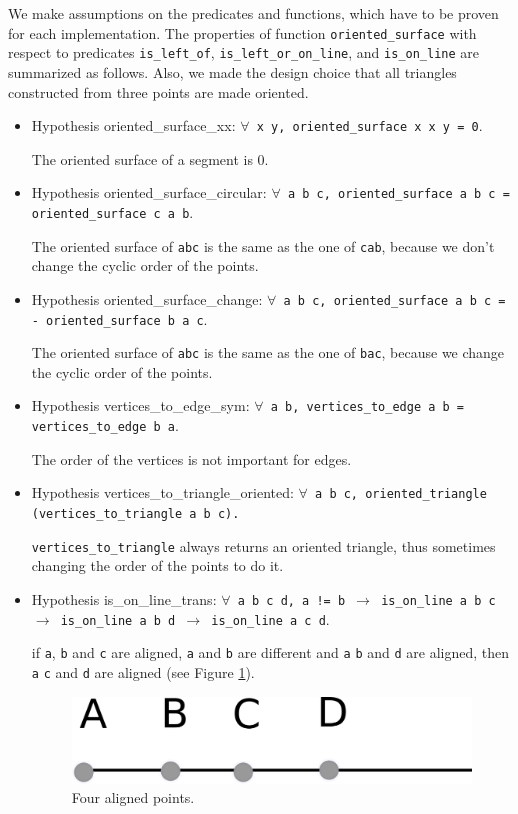 \documentclass[a4paper,10pt]{article}
\def\hypothesis#1#2{{\color{purple}Hypothesis} {\color{blue}#1}: {\tt #2}}
\begin{document}
We make assumptions on the predicates and functions, which have to be proven for each implementation. The properties of function {\tt oriented\_surface} with respect to predicates {\tt is\_left\_of}, {\tt is\_left\_or\_on\_line}, and {\tt is\_on\_line} are summarized as follows.  Also, we made the design choice that all triangles constructed from three points are made oriented.
\begin{itemize}
\item \hypothesis{oriented\_surface\_xx}{$\forall$ x y, {\tt oriented\_surface x x y} = 0}.
  
  The oriented surface of a segment is 0.
\item \hypothesis{oriented\_surface\_circular}{$\forall$ a b c, oriented\_surface a b c = oriented\_surface c a b}.
  
  The oriented surface of {\tt abc} is the same as the one of {\tt cab}, because we don't change the cyclic order of the points.
\item \hypothesis{oriented\_surface\_change}{$\forall$ a b c, oriented\_surface a b c = - oriented\_surface b a c}.
  
  The oriented surface of {\tt abc} is the same as the one of {\tt bac}, because we change the cyclic order of the points.
\item \hypothesis{vertices\_to\_edge\_sym}{$\forall$ a b, vertices\_to\_edge a b = vertices\_to\_edge b a}.

  The order of the vertices is not important for edges.
  \item 
    \hypothesis{vertices\_to\_triangle\_oriented}{$\forall$ a b c, oriented\_triangle (vertices\_to\_triangle a b c).}

    {\tt vertices\_to\_triangle} always returns an oriented triangle, thus sometimes changing the order of the points to do it.
\item\hypothesis{is\_on\_line\_trans}{$\forall$ a b c d, a != b $\rightarrow$ is\_on\_line a b c $\rightarrow$ is\_on\_line a b d $\rightarrow$
    is\_on\_line a c d}.
  
  if {\tt a}, {\tt b} and {\tt c} are aligned, {\tt a} and {\tt b} are different and {\tt a} {\tt b} and {\tt d} are aligned, then {\tt a} {\tt c} and {\tt d} are aligned (see Figure \ref{aligned}).

  \begin{figure}
    \centering
    \includegraphics{aligned}
    \caption{\label{aligned} Four aligned points.}
  \end{figure}
  

\end{itemize}
\end{document}
